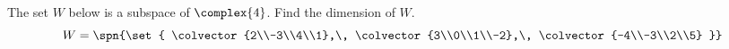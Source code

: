 The set $W$ below is a subspace of $\complex{4}$.  Find the dimension of $W$.
%
\begin{equation*}
W=\spn{\set{
\colvector{2\\-3\\4\\1},\,
\colvector{3\\0\\1\\-2},\,
\colvector{-4\\-3\\2\\5}
}}
\end{equation*}